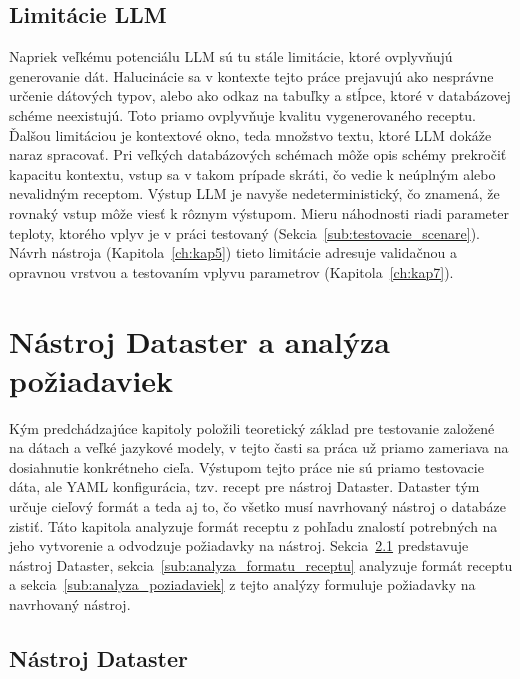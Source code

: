 \section{Limitácie LLM}
\label{sub:limitacie_llm}
Napriek veľkému potenciálu LLM sú tu stále limitácie, ktoré ovplyvňujú generovanie dát. Halucinácie sa v kontexte tejto práce prejavujú ako nesprávne určenie dátových typov, alebo ako odkaz na tabuľky a stĺpce, ktoré v databázovej schéme neexistujú. Toto priamo ovplyvňuje kvalitu vygenerovaného receptu. Ďalšou limitáciou je kontextové okno, teda množstvo textu, ktoré LLM dokáže naraz spracovať. Pri veľkých databázových schémach môže opis schémy prekročiť kapacitu kontextu, vstup sa v takom prípade skráti, čo vedie k neúplným alebo nevalidným receptom. Výstup LLM je navyše nedeterministický, čo znamená, že rovnaký vstup môže viesť k rôznym výstupom. Mieru náhodnosti riadi parameter teploty, ktorého vplyv je v práci testovaný (Sekcia~\ref{sub:testovacie_scenare}). Návrh nástroja (Kapitola~\ref{ch:kap5}) tieto limitácie adresuje validačnou a opravnou vrstvou a testovaním vplyvu parametrov (Kapitola~\ref{ch:kap7}).  

\chapter{Nástroj Dataster a analýza požiadaviek}
\label{ch:kap4}

Kým predchádzajúce kapitoly položili teoretický základ pre testovanie založené na dátach a veľké jazykové modely, v tejto časti sa práca už priamo zameriava na dosiahnutie konkrétneho cieľa. Výstupom tejto práce nie sú priamo testovacie dáta, ale YAML konfigurácia, tzv. recept pre nástroj Dataster. Dataster  tým určuje cieľový formát a teda aj to, čo všetko musí navrhovaný nástroj o databáze zistiť. Táto kapitola analyzuje formát receptu z pohľadu znalostí potrebných na jeho vytvorenie a odvodzuje požiadavky na nástroj. Sekcia~\ref{sub:nastroj_dataster} predstavuje nástroj Dataster, sekcia~\ref{sub:analyza_formatu_receptu}  analyzuje formát receptu a sekcia~\ref{sub:analyza_poziadaviek} z tejto analýzy formuluje požiadavky na navrhovaný nástroj.

\section{Nástroj Dataster}
\label{sub:nastroj_dataster}


